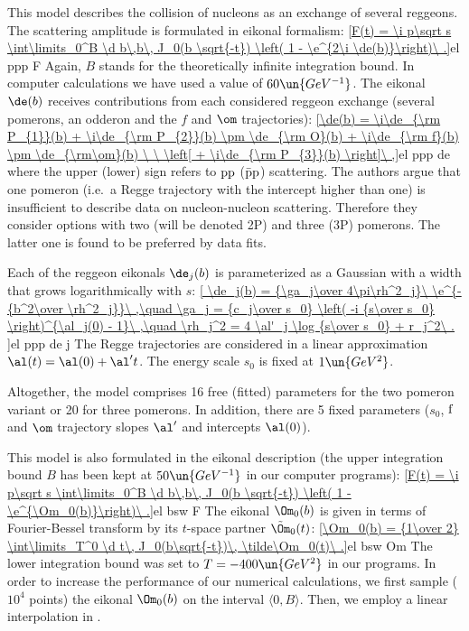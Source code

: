 This model describes the collision of nucleons as an exchange of several reggeons. The scattering amplitude is formulated in eikonal formalism:
\eqref{F(t) = \i p\sqrt s \int\limits_0^B \d b\,b\, J_0(b \sqrt{-t}) \left( 1 - \e^{2\i \de(b)}\right)\ .}{el ppp F}
Again, $B$ stands for the theoretically infinite integration bound. In computer calculations we have used a value of $60\un{GeV^{-1}}$. The eikonal $\de(b)$ receives contributions from each considered reggeon exchange (several pomerons, an odderon and the $f$ and $\om$ trajectories):
\eqref{\de(b) = \i\de_{\rm P_{1}}(b) + \i\de_{\rm P_{2}}(b) \pm \de_{\rm O}(b) + \i\de_{\rm f}(b) \pm \de_{\rm\om}(b) \ \  \left[ + \i\de_{\rm P_{3}}(b) \right]\ ,}{el ppp de}
where the upper (lower) sign refers to $\rm pp$ ($\rm \bar pp$) scattering. The authors argue that one pomeron (i.e.~a Regge trajectory with the intercept higher than one) is insufficient to describe data on nucleon-nucleon scattering. Therefore they consider options with two (will be denoted 2P) and three (3P) pomerons. The latter one is found to be preferred by data fits.

Each of the reggeon eikonals $\de_j(b)$ is parameterized as a Gaussian with a width that grows logarithmically with $s$:
\eqref{
	\de_j(b) = {\ga_j\over 4\pi\rh^2_j}\ \e^{-{b^2\over \rh^2_j}}\ ,\quad
	\ga_j = {c_j\over s_0} \left( -i {s\over s_0} \right)^{\al_j(0) - 1}\ ,\quad
	\rh_j^2 = 4 \al'_j \log {s\over s_0} + r_j^2\ .
}{el ppp de j}
The Regge trajectories are considered in a linear approximation $\al(t) = \al(0) + \al' t$. The energy scale $s_0$ is fixed at $1\un{GeV^2}$.

Altogether, the model comprises 16 free (fitted) parameters for the two pomeron variant or 20 for three pomerons. In addition, there are 5 fixed parameters ($s_0$, $\rm f$ and $\om$ trajectory slopes $\al'$ and intercepts $\al(0)$).



\def\OutlineLabel{The model of Bourrely et al.}

This model is also formulated in the eikonal description (the upper integration bound $B$ has been kept at $50\un{GeV^{-1}}$ in our computer programs):
\eqref{F(t) = \i p\sqrt s \int\limits_0^B \d b\,b\, J_0(b \sqrt{-t}) \left( 1 - \e^{\Om_0(b)}\right)\ .}{el bsw F}
The eikonal $\Om_0(b)$ is given in terms of Fourier-Bessel transform by its $t$-space partner $\tilde\Om_0(t)$:
\eqref{\Om_0(b) = {1\over 2} \int\limits_T^0 \d t\, J_0(b\sqrt{-t})\, \tilde\Om_0(t)\ .}{el bsw Om}
The lower integration bound was set to $T = -400\un{GeV^2}$ in our programs. In order to increase the performance of our numerical calculations, we first sample ($10^4$ points) the eikonal $\Om_0(b)$ on the interval $\langle 0, B\rangle$. Then, we employ a linear interpolation in .

